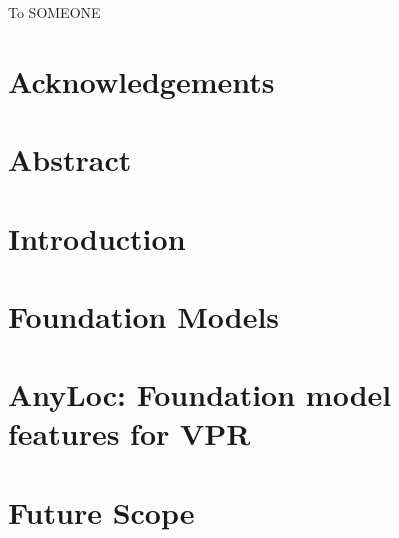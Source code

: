 







\newpage
\thispagestyle{empty}
\vspace*{\fill}
\begin{center}
    {\large
        To SOMEONE
    }
\end{center}
\vspace*{\fill}

\chapter*{Acknowledgements}
\label{ch:ack}


\chapter*{Abstract}
\label{ch:abstract}


\tableofcontents
\listoffigures
\listoftables
\startDocument

\chapter{Introduction}
\label{ch:intro}


\chapter{Foundation Models}
\label{ch:chap2}


\chapter{AnyLoc: Foundation model features for VPR}
\label{ch:chap3}


\chapter{Future Scope}
\label{ch:chap4}


